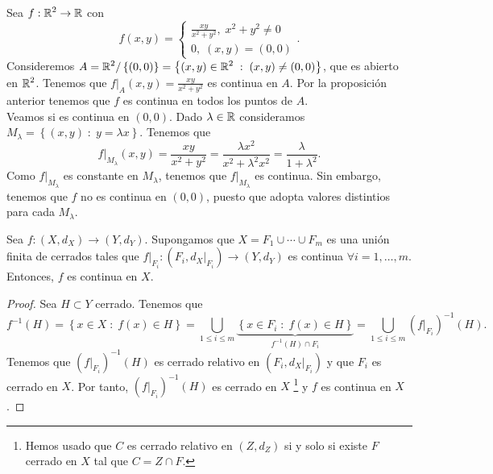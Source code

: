 \begin{eg}
Sea $\displaystyle f : \mathbb{R}^{2} \to \mathbb{R} $ con 
\[f\left(x,y\right) = 
\begin{cases}
\frac{xy}{x^{2}+y^{2}}, \; x^{2} +y^{2} \neq 0 \\
0, \; \left(x,y\right) = \left(0,0\right)
\end{cases}
.\]
Consideremos $\displaystyle A =\mathbb{R}^{2} / \left\{ \left(0,0\right)\right\} = \left\{ \left(x,y\right) \in \mathbb{R}^{2} \; : \; \left(x,y\right) \neq \left(0,0\right)\right\}  $, que es abierto en $\displaystyle \mathbb{R}^{2} $. Tenemos que $\displaystyle f|_{A}\left(x,y\right) = \frac{xy}{x^{2} +y^{2}} $ es continua en $\displaystyle A $. Por la proposición anterior tenemos que $\displaystyle f $ es continua en todos los puntos de $\displaystyle A $. \\
Veamos si es continua en $\displaystyle \left(0,0\right) $. Dado $\displaystyle \lambda \in \mathbb{R} $ consideramos $\displaystyle M_{\lambda } = \left\{ \left(x,y\right) \; : \; y = \lambda x\right\}  $. Tenemos que
\[f | _{M_{\lambda }}\left(x,y\right) = \frac{xy}{x^{2} + y^{2}} = \frac{\lambda x^{2}}{x^{2} + \lambda^{2}x^{2}} = \frac{\lambda }{1 + \lambda ^{2}} .\]
Como $\displaystyle f|_{M_{\lambda }} $ es constante en $\displaystyle M_{\lambda } $, tenemos que $\displaystyle f|_{M_{\lambda }} $ es continua. Sin embargo, tenemos que $\displaystyle f $ no es continua en $\displaystyle \left(0,0\right) $, puesto que adopta valores distintios para cada $\displaystyle M_{\lambda} $.
\end{eg}
\begin{lema}
Sea $\displaystyle f : \left(X, d _{X}\right) \to \left(Y, d _{Y}\right) $. Supongamos que $\displaystyle X = F_{1} \cup \cdots \cup F_{m} $ es una unión finita de cerrados tales que $\displaystyle f|_{F_{i}} : \left(F_{i}, d _{X}|_{F_{i}}\right) \to \left(Y, d _{Y}\right) $ es continua $\displaystyle \forall i = 1, \ldots, m $. Entonces, $\displaystyle f $ es continua en $\displaystyle X $.
\end{lema}
\begin{proof}
Sea $\displaystyle H \subset Y $ cerrado. Tenemos que 
\[f^{-1}\left(H\right) = \left\{ x \in X \; : \; f\left(x\right) \in H\right\} = \bigcup_{1 \leq i \leq m} \underbrace{\left\{ x \in F_{i} \; : \; f\left(x\right) \in H\right\}}_{f^{-1}\left(H\right) \cap F_{i}} = \bigcup_{1\leq i \leq m}\left(f|_{F_{i}}\right)^{-1}\left(H\right) .\]
Tenemos que $\displaystyle \left(f|_{F_{i}}\right)^{-1}\left(H\right) $ es cerrado relativo en $\displaystyle \left(F_{i}, d _{X}|_{F_{i}}\right) $ y que $\displaystyle F_{i} $ es cerrado en $\displaystyle X $. Por tanto, $\displaystyle \left(f|_{F_{i}}\right)^{-1}\left(H\right) $ es cerrado en $\displaystyle X $ \footnote{Hemos usado que $\displaystyle C $ es cerrado relativo en $\displaystyle \left(Z, d _{Z}\right) $ si y solo si existe $\displaystyle F $ cerrado en $\displaystyle X $ tal que $\displaystyle C = Z \cap F $.} y $\displaystyle f $ es continua en $\displaystyle X $.
\end{proof}
